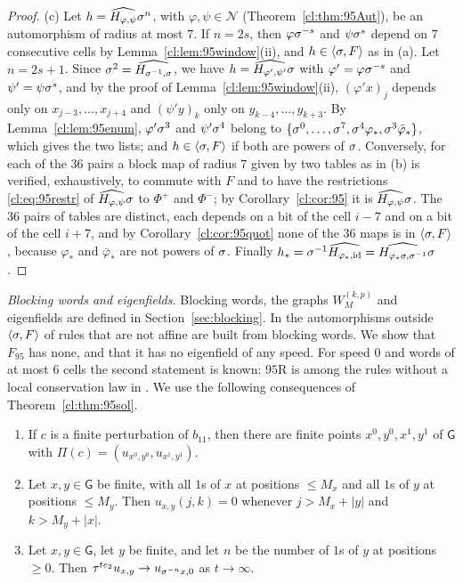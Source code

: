 \begin{proof}
(c) Let $h=\widehat{H_{\varphi,\psi}}\sigma^n$, with $\varphi,\psi\in\mathcal N$ (Theorem~\ref{cl:thm:95Aut}), be an automorphism of radius at most $7$. If $n=2s$, then $\varphi\sigma^{-s}$ and $\psi\sigma^{s}$ depend on $7$ consecutive cells by Lemma~\ref{cl:lem:95window}(ii), and $h\in\langle\sigma,F\rangle$ as in (a). Let $n=2s+1$. Since $\sigma^{2}=\widehat{H_{\sigma^{-1},\sigma}}$, we have $h=\widehat{H_{\varphi',\psi'}}\sigma$ with $\varphi'=\varphi\sigma^{-s}$ and $\psi'=\psi\sigma^{s}$, and by the proof of Lemma~\ref{cl:lem:95window}(ii), $(\varphi'x)_j$ depends only on $x_{j-3},\dots,x_{j+4}$ and $(\psi'y)_k$ only on $y_{k-4},\dots,y_{k+3}$. By Lemma~\ref{cl:lem:95enum}, $\varphi'\sigma^{3}$ and $\psi'\sigma^{4}$ belong to $\{\sigma^0,\dots,\sigma^7,\sigma^4\varphi_{\ast},\sigma^3\bar\varphi_{\ast}\}$, which gives the two lists; and $h\in\langle\sigma,F\rangle$ if both are powers of $\sigma$. Conversely, for each of the $36$ pairs a block map of radius $7$ given by two tables as in (b) is verified, exhaustively, to commute with $F$ and to have the restrictions \eqref{cl:eq:95restr} of $\widehat{H_{\varphi,\psi}}\sigma$ to $\Phi^+$ and $\Phi^-$; by Corollary~\ref{cl:cor:95} it is $\widehat{H_{\varphi,\psi}}\sigma$. The $36$ pairs of tables are distinct, each depends on a bit of the cell $i-7$ and on a bit of the cell $i+7$, and by Corollary~\ref{cl:cor:95quot} none of the $36$ maps is in $\langle\sigma,F\rangle$, because $\varphi_{\ast}$ and $\bar\varphi_{\ast}$ are not powers of $\sigma$. Finally $h_{\ast}=\sigma^{-1}\widehat{H_{\varphi_{\ast},\mathrm{id}}}=\widehat{H_{\varphi_{\ast}\sigma,\sigma^{-1}}}\sigma$.
\end{proof}

\emph{Blocking words and eigenfields.} Blocking words, the graphs $W^{(k,p)}_M$ and eigenfields are defined in Section~\ref{sec:blocking}. In \cite{PaperC} the automorphisms outside $\langle\sigma,F\rangle$ of rules that are not affine are built from blocking words. We show that $F_{95}$ has none, and that it has no eigenfield of any speed. For speed $0$ and words of at most $6$ cells the second statement is known: $95$R is among the rules without a local conservation law in \cite[Section~4, Table~IV]{Takesue1989}. We use the following consequences of Theorem~\ref{cl:thm:95sol}.

\begin{lemma}\label{cl:lem:95finite}
\leavevmode
\begin{enumerate}
\item[(i)] If $c$ is a finite perturbation of $b_{11}$, then there are finite points $x^0,y^0,x^1,y^1$ of $\mathsf G$ with $\Pi(c)=(u_{x^0,y^0},u_{x^1,y^1})$.
\item[(ii)] Let $x,y\in\mathsf G$ be finite, with all $1$s of $x$ at positions $\le M_x$ and all $1$s of $y$ at positions $\le M_y$. Then $u_{x,y}(j,k)=0$ whenever $j>M_x+|y|$ and $k>M_y+|x|$.
\item[(iii)] Let $x,y\in\mathsf G$, let $y$ be finite, and let $n$ be the number of $1$s of $y$ at positions $\ge0$. Then $\tau^{te_2}u_{x,y}\to u_{\sigma^{-n}x,0}$ as $t\to\infty$.
\end{enumerate}
\end{lemma}

